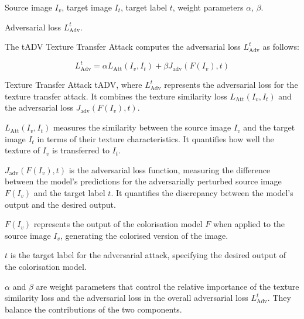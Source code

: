 
Source image $I_v$, target image $I_t$, target label $t$, weight parameters $\alpha$, $\beta$.

Adversarial loss $L_{\text{Adv}}^t$.

The tADV Texture Transfer Attack computes the adversarial loss $L_{\text{Adv}}^t$ as follows:

\[
L_{\text{Adv}}^t = \alpha L_{\text{Att}}(I_v, I_t) + \beta J_{\text{adv}} \left(F(I_v), t \right)
\]

Texture Transfer Attack tADV, where
$L_{\text{Adv}}^t$ represents the adversarial loss for the texture transfer attack. It combines the texture similarity loss $L_{\text{Att}}(I_v, I_t)$ and the adversarial loss $J_{\text{adv}} \left(F(I_v), t \right)$.

$L_{\text{Att}}(I_v, I_t)$ measures the similarity between the source image $I_v$ and the target image $I_t$ in terms of their texture characteristics. It quantifies how well the texture of $I_v$ is transferred to $I_t$.

$J_{\text{adv}} \left(F(I_v), t \right)$ is the adversarial loss function, measuring the difference between the model's predictions for the adversarially perturbed source image $F(I_v)$ and the target label $t$. It quantifies the discrepancy between the model's output and the desired output.

$F(I_v)$ represents the output of the colorisation model $F$ when applied to the source image $I_v$, generating the colorised version of the image.

$t$ is the target label for the adversarial attack, specifying the desired output of the colorisation model.

$\alpha$ and $\beta$ are weight parameters that control the relative importance of the texture similarity loss and the adversarial loss in the overall adversarial loss $L_{\text{Adv}}^t$. They balance the contributions of the two components.